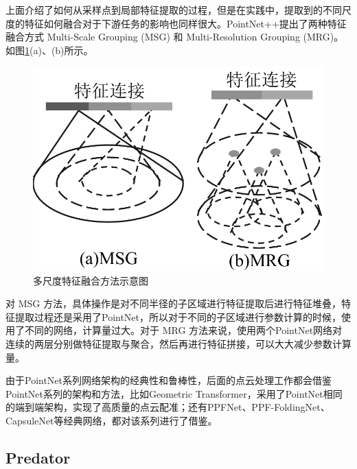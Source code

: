 上面介绍了如何从采样点到局部特征提取的过程，但是在实践中，提取到的不同尺度的特征如何融合对于下游任务的影响也同样很大。PointNet++提出了两种特征融合方式 Multi-Scale Grouping (MSG) 和 Multi-Resolution Grouping (MRG)。如图\ref{fig:pnpp_grouping}(a)、(b)所示。

\begin{figure}[H]
    \vspace{-5mm}
    \centering
    \includegraphics[width=0.45\linewidth]{images/pnpp_group.pdf}
    \caption{多尺度特征融合方法示意图}
    \label{fig:pnpp_grouping}
    \vspace{-25mm}
\end{figure}

对 MSG 方法，具体操作是对不同半径的子区域进行特征提取后进行特征堆叠，特征提取过程还是采用了PointNet，所以对于不同的子区域进行参数计算的时候，使用了不同的网络，计算量过大。对于 MRG 方法来说，使用两个PointNet网络对连续的两层分别做特征提取与聚合，然后再进行特征拼接，可以大大减少参数计算量。

由于PointNet系列网络架构的经典性和鲁棒性，后面的点云处理工作都会借鉴PointNet系列的架构和方法，比如Geometric Transformer\cite{qin2022geometric}，采用了PointNet相同的端到端架构，实现了高质量的点云配准；还有PPFNet\cite{deng2018ppf}、PPF-FoldingNet\cite{deng2018ppfnet}、CapsuleNet\cite{sabour2017dynamic}等经典网络，都对该系列进行了借鉴。

\subsection{Predator}

